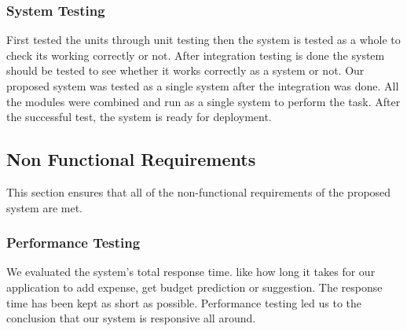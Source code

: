 \documentclass[12pt]{article}
\begin{document}
\noindent
\subsubsection{System Testing}
\vspace{0.5cm} %


\noindent
\normalsize First tested the units through unit testing then the system is tested as a whole to check its working correctly or not. After integration testing is done the system should be tested to see whether it works correctly as a system or not. Our proposed system was tested as a single system after the integration was done. All the modules were combined and run as a single system to perform the task. After the successful test, the system is ready for deployment.\\

\vspace{0.5 cm}
\noindent
\subsection{Non Functional Requirements}
\vspace{0.5cm} %

\noindent
\normalsize This section ensures that all of the non-functional requirements of the proposed system are met.
\vspace{0.5cm} %

\noindent
\subsubsection{Performance Testing}
\vspace{0.5cm} %

\noindent
\normalsize We evaluated the system's total response time. like how long it takes for our application to add expense, get budget prediction or suggestion. The response time has been kept as short as possible. Performance testing led us to the conclusion that our system is responsive all around.\cite{bozkus2009analytical}
\vspace{0.5cm}
\end{document}
